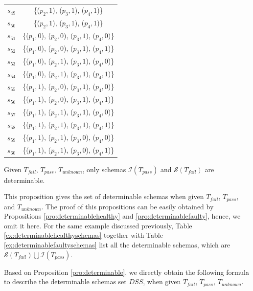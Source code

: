 \begin{table}[htbp]
\begin{tabular}{|c|c|}
   $s_{49}$ & \{($p_{2}, 1$), ($p_{3}, 1$), ($p_{4}, 1$)\}  \\
   $s_{50}$ & \{($p_{2}, 1$), ($p_{3}, 1$), ($p_{4}, 1$)\}  \\

  $s_{51}$ & \{($p_{1}, 0$), ($p_{2}, 0$), ($p_{3}, 1$), ($p_{4}, 0$)\}\\
  $s_{52}$ & \{($p_{1}, 0$), ($p_{2}, 0$), ($p_{3}, 1$), ($p_{4}, 1$)\}\\
  $s_{53}$ & \{($p_{1}, 0$), ($p_{2}, 1$), ($p_{3}, 1$), ($p_{4}, 0$)\}\\
  $s_{54}$ & \{($p_{1}, 0$), ($p_{2}, 1$), ($p_{3}, 1$), ($p_{4}, 1$)\}\\
  $s_{55}$ & \{($p_{1}, 1$), ($p_{2}, 0$), ($p_{3}, 1$), ($p_{4}, 0$)\}\\
  $s_{56}$ & \{($p_{1}, 1$), ($p_{2}, 0$), ($p_{3}, 1$), ($p_{4}, 1$)\}\\
  $s_{57}$ & \{($p_{1}, 1$), ($p_{2}, 1$), ($p_{3}, 1$), ($p_{4}, 0$)\}\\
  $s_{58}$ & \{($p_{1}, 1$), ($p_{2}, 1$), ($p_{3}, 1$), ($p_{4}, 1$)\}\\

  $s_{59}$ & \{($p_{1}, 1$), ($p_{2}, 1$), ($p_{3}, 0$), ($p_{4}, 0$)\}\\
  $s_{60}$ & \{($p_{1}, 1$), ($p_{2}, 1$), ($p_{3}, 0$), ($p_{4}, 1$)\}\\

  \hline
    \end{tabular}%
\end{table}



\begin{proposition}\label{pro:determinable}
Given  $T_{fail}$, $T_{pass}$, $T_{unknown}$, only schemas $\mathcal{I}(T_{pass})$ and  $\mathcal{S}(T_{fail})$  are determinable.
\end{proposition}

This proposition gives the set of determinable schemas when given $T_{fail}$, $T_{pass}$, and $T_{unknown}$. The proof of this propositions can be easily obtained by Propositions \ref{pro:determinablehealthy} and \ref{pro:determinablefaulty}, hence, we omit it here. For the same example discussed previously, Table \ref{ex:determinablehealthyschemas} together with Table \ref{ex:determinablefaultyschemas} list all the determinable schemas, which are $\mathcal{S}(T_{fail}) \bigcup \mathcal{I}(T_{pass})$.

Based on Proposition \ref{pro:determinable}, we directly obtain the following formula to describe the determinable schemas set $DSS$, when given $T_{fail}$, $T_{pass}$, $T_{unknown}$.


